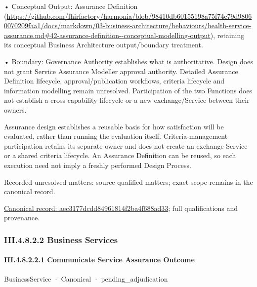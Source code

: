 •
Conceptual Output: Assurance Definition (\url{https://github.com/fhirfactory/harmonia/blob/98410db60155198a75f74c79d98060070209faa1/docs/markdown/03-business-architecture/behaviours/health-service-assurance.md#42-assurance-definition--conceptual-modelling-output}), retaining its conceptual Business Architecture output/boundary treatment.



•
Boundary: Governance Authority establishes what is authoritative. Design does not grant Service Assurance Modeller approval authority. Detailed Assurance Definition lifecycle, approval/publication workflows, criteria lifecycle and information modelling remain unresolved. Participation of the two Functions does not establish a cross-capability lifecycle or a new exchange/Service between their owners.



Assurance design establishes a reusable basis for how satisfaction will be evaluated, rather than running the evaluation itself. Criteria-management participation retains its separate owner and does not create an exchange Service or a shared criteria lifecycle. An Assurance Definition can be reused, so each execution need not imply a freshly performed Design Process.


{\small Recorded unresolved matters: source-qualified matters; exact scope remains in the canonical record.}\par
{\footnotesize \href{../../../../../../../continuum/business/business-process/aec3177dcdd84961814f2ba4f688ad33.md}{Canonical record: aec3177dcdd84961814f2ba4f688ad33}; full qualifications and provenance.}\par
\subsubsection*{III.4.8.2.2 Business Services}
\label{navigation:III.4.8.2.2}

\paragraph*{III.4.8.2.2.1 Communicate Service Assurance Outcome}
\label{navigation:III.4.8.2.2.1}

\label{element:371b04d6bbf84b53a3c5667ae6df2809}
{\small BusinessService · Canonical · pending\_adjudication}\par

